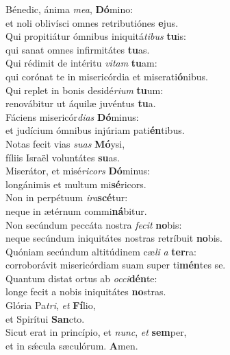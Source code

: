 \evenverse Bénedic, ánima \textit{me}\textit{a}, \textbf{Dó}mino:~\*\\
\evenverse et noli oblivísci omnes retributiónes \textbf{e}jus.\\
\oddverse Qui propitiátur ómnibus iniquitá\textit{ti}\textit{bus} \textbf{tu}is:~\*\\
\oddverse qui sanat omnes infirmitátes \textbf{tu}as.\\
\evenverse Qui rédimit de intéritu \textit{vi}\textit{tam} \textbf{tu}am:~\*\\
\evenverse qui corónat te in misericórdia et miserati\textbf{ó}nibus.\\
\oddverse Qui replet in bonis desidé\textit{ri}\textit{um} \textbf{tu}um:~\*\\
\oddverse renovábitur ut áquilæ juvéntus \textbf{tu}a.\\
\evenverse Fáciens misericór\textit{di}\textit{as} \textbf{Dó}minus:~\*\\
\evenverse et judícium ómnibus injúriam pati\textbf{én}tibus.\\
\oddverse Notas fecit vias \textit{su}\textit{as} \textbf{Mó}ysi,~\*\\
\oddverse fíliis Israël voluntátes \textbf{su}as.\\
\evenverse Miserátor, et misé\textit{ri}\textit{cors} \textbf{Dó}minus:~\*\\
\evenverse longánimis et multum mi\textbf{sé}ricors.\\
\oddverse Non in perpétuum \textit{i}\textit{ra}\textbf{scé}tur:~\*\\
\oddverse neque in ætérnum commi\textbf{ná}bitur.\\
\evenverse Non secúndum peccáta nostra \textit{fe}\textit{cit} \textbf{no}bis:~\*\\
\evenverse neque secúndum iniquitátes nostras retríbuit \textbf{no}bis.\\
\oddverse Quóniam secúndum altitúdinem cæ\textit{li} \textit{a} \textbf{ter}ra:~\*\\
\oddverse corroborávit misericórdiam suam super ti\textbf{mén}tes se.\\
\evenverse Quantum distat ortus ab \textit{oc}\textit{ci}\textbf{dén}te:~\*\\
\evenverse longe fecit a nobis iniquitátes \textbf{no}stras.\\
\oddverse Glória Pa\textit{tri}, \textit{et} \textbf{Fí}lio,~\*\\
\oddverse et Spirítui \textbf{San}cto.\\
\evenverse Sicut erat in princípio, et \textit{nunc}, \textit{et} \textbf{sem}per,~\*\\
\evenverse et in sǽcula sæculórum. \textbf{A}men.\\
